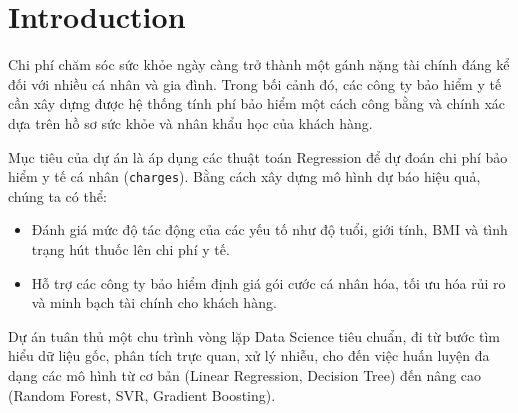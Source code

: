 \section{Introduction}

Chi phí chăm sóc sức khỏe ngày càng trở thành một gánh nặng tài chính đáng kể đối với nhiều cá nhân và gia đình. Trong bối cảnh đó, các công ty bảo hiểm y tế cần xây dựng được hệ thống tính phí bảo hiểm một cách công bằng và chính xác dựa trên hồ sơ sức khỏe và nhân khẩu học của khách hàng.

Mục tiêu của dự án là áp dụng các thuật toán Regression để dự đoán chi phí bảo hiểm y tế cá nhân (\texttt{charges}). Bằng cách xây dựng mô hình dự báo hiệu quả, chúng ta có thể:
\begin{itemize}
    \item Đánh giá mức độ tác động của các yếu tố như độ tuổi, giới tính, BMI và tình trạng hút thuốc lên chi phí y tế.
    \item Hỗ trợ các công ty bảo hiểm định giá gói cước cá nhân hóa, tối ưu hóa rủi ro và minh bạch tài chính cho khách hàng.
\end{itemize}

Dự án tuân thủ một chu trình vòng lặp Data Science tiêu chuẩn, đi từ bước tìm hiểu dữ liệu gốc, phân tích trực quan, xử lý nhiễu, cho đến việc huấn luyện đa dạng các mô hình từ cơ bản (Linear Regression, Decision Tree) đến nâng cao (Random Forest, SVR, Gradient Boosting).
